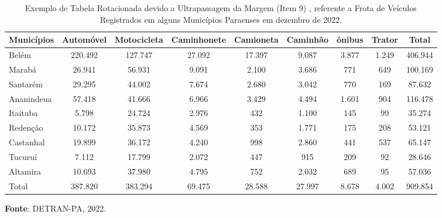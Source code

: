 \begin{sidewaystable}
\centering
    {
\caption{Exemplo de Tabela Rotacionada devido a Ultrapassagem da Margem (Item 9) , referente a Frota de Veículos Registrados em alguns Municípios Paraenses em dezembro de 2022.}
\label{tabelarotacionada}
    \vspace{0.2cm}
\begin{tabular}{l|c|c|c|c|c|c|c|c}
\hline\hline
Municípios & Automóvel & Motocicleta & Caminhonete  & Camioneta & Caminhão  & ônibus & Trator & Total     \\
\hline\hline
Belém      & 220.492  & 127.747      & 27.092       & 17.397    & 9.087     & 3.877  & 1.249  & 406.944   \\
Marabá     & 26.941   & 56.931       & 9.091        & 2.100  & 3.686     & 771      & 649     & 100.169   \\
Santarém   & 29.295   & 44.002       & 7.674        & 2.680  & 3.042     & 770      & 169     & 87.632    \\ 
Ananindeua & 57.418   & 41.666       & 6.966        & 3.429  & 4.494     & 1.601    & 904     & 116.478   \\  
Itaituba   & 5.798    & 24.724       & 2.976        & 432    & 1.100     & 145      & 99      & 35.274    \\  
Redenção   & 10.172   & 35.873       & 4.569        & 353    & 1.771     & 175      & 208     & 53.121    \\
Castanhal  & 19.899   & 36.172       & 4.240        & 998    & 2.860     & 441      & 537     &  65.147    \\
Tucuruí    & 7.112    & 17.799       & 2.072        & 447    & 915       & 209      & 92      &  28.646    \\
Altamira   & 10.693   & 37.980       & 4.795        & 752    & 2.032     & 689      & 95      &  57.036   \\
\hline\hline
  Total    & 387.820  & 383.294      & 69.475      & 28.588  & 27.997    & 8.678    & 4.002   &  909.854  \\
\hline\hline 
\end{tabular}} 
\begin{flushleft}
\hspace{0.2cm}
\textbf{Fonte}: DETRAN-PA, 2022. 
\end{flushleft}
\end{sidewaystable}




